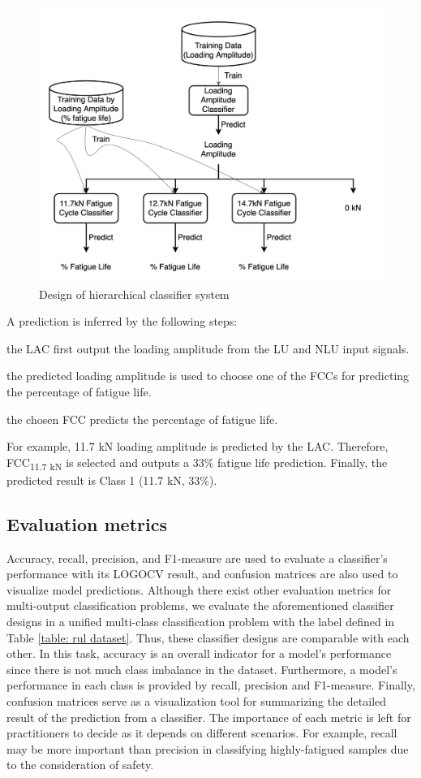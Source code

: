 \begin{figure}[tb]
    \centering
    \includegraphics[width=0.9\linewidth]{fig/hierarchical_classifier.png}
    \caption{Design of hierarchical classifier system}
    \label{fig: hierarchical classifier}
\end{figure}


A prediction is inferred by the following steps: 
\begin{enumerate*}[label=(\alph*)]
    \item the LAC first output the loading amplitude from the LU and NLU input signals.
    \item the predicted loading amplitude is used to choose one of the FCCs for predicting the percentage of fatigue life.
    \item the chosen FCC predicts the percentage of fatigue life.
\end{enumerate*}
For example, 11.7 kN loading amplitude is predicted by the LAC. Therefore, FCC\textsubscript{11.7 kN} is selected and outputs a 33\% fatigue life prediction. Finally, the predicted result is Class 1 (11.7 kN, 33\%).

\subsection{Evaluation metrics}
Accuracy, recall, precision, and F1-measure are used to evaluate a classifier's performance with its LOGOCV result, and confusion matrices are also used to visualize model predictions. Although there exist other evaluation metrics for multi-output classification problems, we evaluate the aforementioned classifier designs in a unified multi-class classification problem with the label defined in Table \ref{table: rul dataset}. Thus, these classifier designs are comparable with each other. In this task, accuracy is an overall indicator for a model's performance since there is not much class imbalance in the dataset. Furthermore, a model's performance in each class is provided by recall, precision and F1-measure. Finally, confusion matrices serve as a visualization tool for summarizing the detailed result of the prediction from a classifier. The importance of each metric is left for practitioners to decide as it depends on different scenarios. For example, recall may be more important than precision in classifying highly-fatigued samples due to the consideration of safety.

